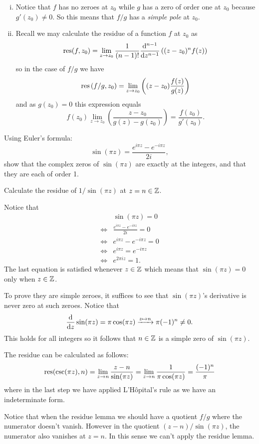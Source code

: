 \documentclass[12pt]{memoir}
\begin{document}
\begin{ptcbr}
    \begin{enumerate}[i)]
        \itemsep=-0.4em
        \item Notice that $f$ has no zeroes at $z_0$ while $g$ has a zero of order one at $z_0$ because $g'(z_0)\neq 0$. So this means that $f/g$ has a \emph{simple pole} at $z_0$. 
        \item Recall we may calculate the residue of a function $f$ at $z_0$ as 
        $$\operatorname*{res}(f,z_0)=\lim_{z\to z_0}\frac{1}{(n-1)!}\dv[n-1]{z}\left((z-z_0)^nf(z)\right)$$
        so in the case of $f/g$ we have 
        $$\operatorname*{res}\left(f/g,z_0\right)=\lim_{z\to z_0}\left((z-z_0)\frac{f(z)}{g(z)}\right)$$
        and as $g(z_0)=0$ this expression equals 
        $$f(z_0)\lim_{z\to z_0}\left(\frac{z-z_0}{g(z)-g(z_0)}\right)=\frac{f(z_0)}{g'(z_0)}.$$
    \end{enumerate}
\end{ptcbr}

\begin{Ej}
    Using Euler's formula: 
    $$\sin(\pi z)=\frac{e^{i\pi z}-e^{-i\pi z}}{2i},$$
    show that the complex zeros of $\sin(\pi z)$ are exactly at the integers, and that they
are each of order 1.\par 
Calculate the residue of $1/\sin(\pi z)$ at $z= n\in\mathbb{Z}$.
\end{Ej}

\begin{ptcbr}
    Notice that 
    \begin{align*}
        &\sin(\pi z)=0\\
        \iff&\frac{e^{i\pi z}-e^{-i\pi z}}{2i}=0\\
        \iff&e^{i\pi z}-e^{-i\pi z}=0\\
        \iff&e^{i\pi z}=e^{-i\pi z}\\
        \iff&e^{2\pi i z}=1.
    \end{align*}
    The last equation is satisfied whenever $z\in\mathbb{Z}$ which means that $\sin(\pi z)=0$ only when $z\in\mathbb{Z}$.\par 
    To prove they are simple zeroes, it suffices to see that $\sin(\pi z)$'s derivative is never zero at such zeroes. Notice that 
    $$\dv{z}\sin(\pi z)=\pi\cos(\pi z)\xrightarrow[]{z\mapsto n}\pi (-1)^n\neq 0.$$
    This holds for all integers so it follows that $n\in\mathbb{Z}$ is a simple zero of $\sin(\pi z)$.\par 
    The residue can be calculated as follows: 
    $$\operatorname*{res}(\csc(\pi z),n)=\lim_{z\to n}\frac{z-n}{\sin(\pi z)}=\lim_{z\to n}\frac{1}{\pi\cos(\pi z)}=\frac{(-1)^n}{\pi}$$
    where in the last step we have applied L'H\^{o}pital's rule as we have an indeterminate form.\par 
    Notice that when the residue lemma we should have a quotient $f/g$ where the numerator doesn't vanish. However in the quotient $(z-n)/\sin(\pi z)$, the numerator also vanishes at $z=n$. In this sense we can't apply the residue lemma. 
\end{ptcbr}
\end{document}
